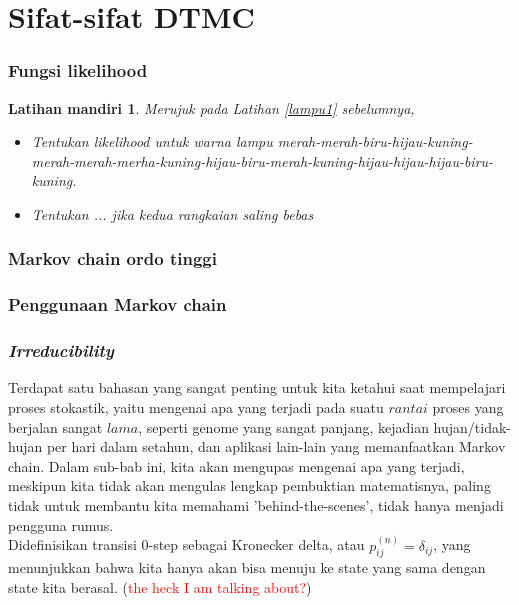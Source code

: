 \documentclass[11pt,b5paper,twoside]{book}
\newtheorem{test}[theorem]{Latihan mandiri}
\begin{document}
	\section{Sifat-sifat DTMC} %
	
		\subsubsection{Fungsi likelihood}
		
		\begin{test}\label{lampu2}
			Merujuk pada Latihan \ref{lampu1} sebelumnya, 
			\begin{itemize}
				\item Tentukan likelihood untuk warna lampu merah-merah-biru-hijau-kuning-merah-merah-merha-kuning-hijau-biru-merah-kuning-hijau-hijau-hijau-biru-kuning.
				
				\item Tentukan ... jika kedua rangkaian saling bebas
			\end{itemize} 
		\end{test}
		\subsubsection{Markov chain ordo tinggi}
		
		\subsubsection{Penggunaan Markov chain}
		
		\subsubsection{\textit{Irreducibility}}
		
		\noindent Terdapat satu bahasan yang sangat penting untuk kita ketahui saat mempelajari proses stokastik, yaitu mengenai apa yang terjadi pada suatu $rantai$ proses yang berjalan sangat $lama$, seperti genome yang sangat panjang,  kejadian hujan/tidak-hujan per hari dalam setahun, dan aplikasi lain-lain yang memanfaatkan Markov chain. Dalam sub-bab ini, kita akan mengupas mengenai apa yang terjadi, meskipun kita tidak akan mengulas lengkap pembuktian matematisnya, paling tidak untuk membantu kita memahami 'behind-the-scenes', tidak hanya menjadi pengguna rumus. \\
		
		\noindent Didefinisikan transisi 0-step sebagai Kronecker delta, atau $p_{ij}^{(n)} = \delta_{ij}$, yang menunjukkan bahwa kita hanya akan bisa menuju ke state yang sama dengan state kita berasal. (\textcolor{red}{the heck I am talking about?})
		
\end{document}
